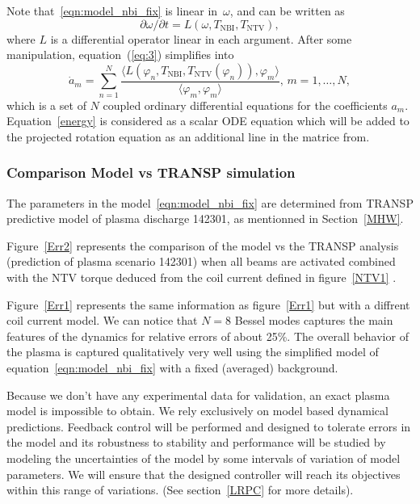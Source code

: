 \documentclass[12pt,lot, lof]{puthesis}
\begin{document}
Note that~\eqref{eqn:model_nbi_fix} is linear in~$\omega$, and can be written as
\begin{equation}
\label{eq:3}
\partial \omega/\partial t=L(\omega,T_\text{NBI},T_\text{NTV}),
\end{equation}
where $L$ is a differential operator linear in each argument. After some manipulation, equation~(\ref{eq:3}) simplifies into  
%
\begin{equation*}
  \dot a_m = \sum_{n=1}^N \frac{\langle L(\varphi_n, T_\text{NBI}, T_\text{NTV}(\varphi_n)),
    \varphi_m\rangle}{\langle \varphi_m,\varphi_m\rangle},\, m=1,\ldots,N,
\end{equation*}
which is a set of $N$ coupled ordinary differential equations for the coefficients $a_m$.\\
%
Equation~{\ref{energy}} is considered as a scalar ODE equation which will be added to the projected rotation equation as an additional line in the matrice from.

\subsubsection{Comparison Model vs TRANSP simulation}

The parameters in the model~\eqref{eqn:model_nbi_fix} are determined from TRANSP predictive model of plasma discharge 142301, as mentionned in Section~\ref{MHW}.  

Figure~\ref{Err2} represents the comparison of the model vs the TRANSP analysis (prediction of plasma scenario 142301) when all beams are activated combined with the NTV torque deduced from the coil current defined in figure~\ref{NTV1} .  

Figure~\ref{Err1} represents the same information as figure~\ref{Err1} but with a diffrent coil current model. We can notice that $N = 8$ Bessel modes captures the main features of the dynamics for relative errors of about 25\%.
The overall behavior of the plasma is captured qualitatively very well using the simplified model of equation~\eqref{eqn:model_nbi_fix} with a fixed (averaged) background. 

Because we don't have any experimental data for validation, an exact plasma model is impossible to obtain. We rely exclusively on model based dynamical predictions. Feedback control will be performed and designed to tolerate errors in the model and its robustness to stability and performance will be studied by modeling the uncertainties of the model by some intervals of variation of model parameters. We will ensure that the designed controller will reach its objectives within this range of variations. (See section~{\ref{LRPC}} for more details). 
\end{document}
